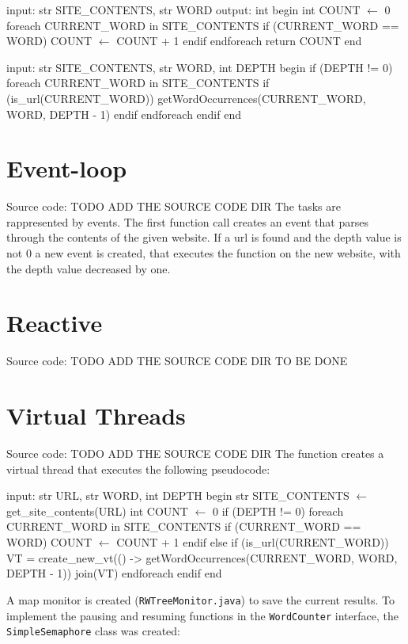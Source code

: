 \documentclass[12pt, a4paper]{report}
\begin{document}
\newpage

\begin{algorithm}[caption={countTask expressed in pseudocode}, label={alg1}]
input: str SITE_CONTENTS, str WORD
output: int
begin
    int COUNT $\gets$ 0
    foreach CURRENT_WORD in SITE_CONTENTS
        if (CURRENT_WORD == WORD)
            COUNT $\gets$ COUNT + 1
        endif
    endforeach
    return COUNT
end       
\end{algorithm}

\begin{algorithm}[caption={linkTask expressed in pseudocode}, label={alg2}]
input: str SITE_CONTENTS, str WORD, int DEPTH
begin
    if (DEPTH != 0)
        foreach CURRENT_WORD in SITE_CONTENTS
            if (is_url(CURRENT_WORD))
                getWordOccurrences(CURRENT_WORD, WORD, DEPTH - 1)
            endif
        endforeach
    endif
end       
\end{algorithm}
\section{Event-loop}
Source code: TODO ADD THE SOURCE CODE DIR
The tasks are rappresented by events. The first function call creates an event that parses through the contents of the given website.
 If a url is found and the depth value is not 0 a new event is created, that executes the function on the new website, with the depth value decreased by one.

\section{Reactive}
Source code: TODO ADD THE SOURCE CODE DIR
TO BE DONE
\section{Virtual Threads}
Source code: TODO ADD THE SOURCE CODE DIR
The function creates a virtual thread that executes the following pseudocode:

\newpage

\begin{algorithm}[label={alg3}]
input: str URL, str WORD, int DEPTH
begin
    str SITE_CONTENTS $\gets$ get_site_contents(URL)
    int COUNT $\gets$ 0
    if (DEPTH != 0)
        foreach CURRENT_WORD in SITE_CONTENTS
            if (CURRENT_WORD == WORD)
                COUNT $\gets$ COUNT + 1
            endif
            else if (is_url(CURRENT_WORD))
                VT = create_new_vt(() -> 
                    getWordOccurrences(CURRENT_WORD, WORD, DEPTH - 1))
                join(VT)
        endforeach
    endif
end       
\end{algorithm}

A map monitor is created (\texttt{RWTreeMonitor.java}) to save the current results. To implement the pausing and resuming functions in the
 \texttt{WordCounter} interface, the \texttt{SimpleSemaphore} class was created:


\end{document}
